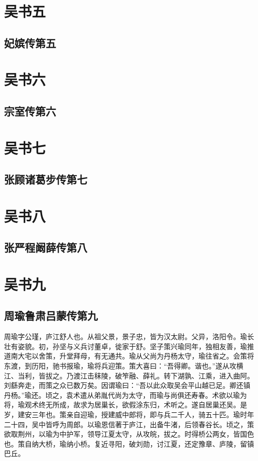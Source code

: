 \documentclass[12pt,UTF8]{ctexbook}
\begin{document}
\part{吴书五}
\chapter{妃嫔传第五}

\part{吴书六}
\chapter{宗室传第六}

\part{吴书七}
\chapter{张顾诸葛步传第七}

\part{吴书八}
\chapter{张严程阚薛传第八}

\part{吴书九}

\chapter{周瑜鲁肃吕蒙传第九}


周瑜字公瑾，庐江舒人也。从祖父景，景子忠，皆为汉太尉。父异，洛阳令。瑜长壮有姿貌。初，孙坚与义兵讨董卓，徙家于舒。坚子策兴瑜同年，独相友善，瑜推道南大宅以舍策，升堂拜母，有无通共。瑜从父尚为丹杨太守，瑜往省之。会策将东渡，到历阳，驰书报瑜，瑜将兵迎策。策大喜曰：“吾得卿。谐也。”遂从攻横江、当利，皆拔之。乃渡江击秣陵，破笮融、薛礼。转下湖孰、江乘，进入曲阿。刘繇奔走，而策之众已数万矣。因谓瑜曰：“吾以此众取吴会平山越已足。卿还镇丹杨。”瑜还。顷之，袁术遣从弟胤代尚为太守，而瑜与尚俱还寿春。术欲以瑜为将，瑜观术终无所成，故求为居巢长，欲假涂东归，术听之。遂自居巢还吴。是岁，建安三年也。策亲自迎瑜，授建威中郎将，即与兵二千人，骑五十匹。瑜时年二十四，吴中皆呼为周郎。以瑜恩信著于庐江，出备牛渚，后领春谷长。顷之，策欲取荆州，以瑜为中护军，领导江夏太守，从攻皖，拔之。时得桥公两女，皆国色也。策自纳大桥，瑜纳小桥。复近寻阳，破刘勋，讨江夏，还定豫章、庐陵，留镇巴丘。
\end{document}
